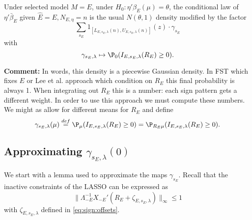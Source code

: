 \documentclass{article}
\newcommand{\OLS}{\bar{\beta}}
\begin{document}
        \begin{lemma}
          Under selected model $M=E$, under
          $H_0:\eta'\beta_E(\mu)=\theta$, the conditional law of
          $\eta'\OLS_E$ given $\hat{E}=E, N_{E,\eta}=n$ is the usual
          $N(\theta, 1)$ density modified by the factor
          \begin{equation}
            \label{eq:union}
            \sum_{s_E} 1_{[L_{E,s_E,\lambda}(n), U_{E,s_E,\lambda}(n)]}(z) \cdot
            \gamma_{s_E}
            \end{equation}
          with
        $$ \gamma_{s_E,\lambda} \mapsto \P_0(I_{E,s_E,\lambda}(R_E) \geq 0).
        $$
          \end{lemma}

        {\bf Comment:} In words, this density is a piecewise Gaussian
        density. In FST which fixes $E$ or Lee et al. approach which
        condition on $R_E$ this final probability is always 1. When
        integrating out $R_E$ this is a number: each sign pattern gets
        a different weight. In order to use this approach we must
        compute these numbers.  We might as allow for different means
        for $R_E$ and define
          \begin{equation}
            \label{eq:sign:prob}
            \gamma_{s_E,\lambda}(\mu) \overset{def}{=} \P_{\mu}(I_{E,s_E,\lambda}(R_E)
            \geq 0) = \P_{R_E\mu}(I_{E,s_E,\lambda}(R_E) \geq 0).
          \end{equation}
        
          \subsection{Approximating $\gamma_{s_E,\lambda}(0)$}

          We start with a lemma used to approximate the maps
          $\gamma_{s_E}$. Recall that the inactive constraints of the
          LASSO can be expressed as
          \begin{equation}
            \label{eq:inactive}
            \|\Lambda_{-E}^{-1}X_{-E}'(R_E + \zeta_{E,s_E,\lambda})\|_{\infty}
            \leq 1
            \end{equation}
          with $\zeta_{E,s_E,\lambda}$ defined in \eqref{eq:sign:offsets}.
\end{document}
